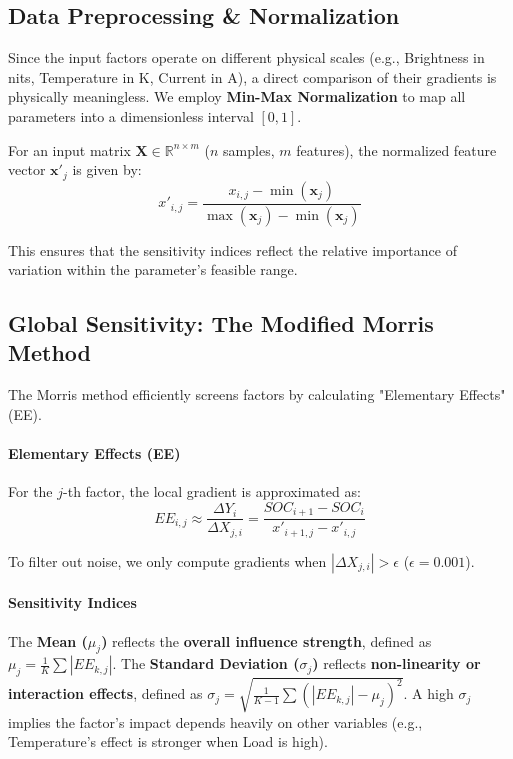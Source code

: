 \documentclass{mcmthesis}
\begin{document}
\subsection{Data Preprocessing \& Normalization}
Since the input factors operate on different physical scales (e.g., Brightness in nits, Temperature in K, Current in A), a direct comparison of their gradients is physically meaningless. We employ \textbf{Min-Max Normalization} to map all parameters into a dimensionless interval $[0, 1]$.

For an input matrix $\mathbf{X} \in \mathbb{R}^{n \times m}$ ($n$ samples, $m$ features), the normalized feature vector $\mathbf{x}'_j$ is given by:
\begin{equation}
x'_{i,j} = \frac{x_{i,j} - \min(\mathbf{x}_j)}{\max(\mathbf{x}_j) - \min(\mathbf{x}_j)}
\end{equation}

This ensures that the sensitivity indices reflect the relative importance of variation within the parameter's feasible range.

\subsection{Global Sensitivity: The Modified Morris Method}
The Morris method efficiently screens factors by calculating "Elementary Effects" (EE).

\paragraph{Elementary Effects (EE)}
For the $j$-th factor, the local gradient is approximated as:
\begin{equation}
EE_{i,j} \approx \frac{\Delta Y_i}{\Delta X_{j,i}} = \frac{SOC_{i+1} - SOC_i}{x'_{i+1,j} - x'_{i,j}}
\end{equation}

To filter out noise, we only compute gradients when $|\Delta X_{j,i}| > \epsilon$ ($\epsilon=0.001$).

\paragraph{Sensitivity Indices}
The \textbf{Mean ($\mu_j$)} reflects the \textbf{overall influence strength}, defined as $\mu_j = \frac{1}{K} \sum |EE_{k,j}|$. The \textbf{Standard Deviation ($\sigma_j$)} reflects \textbf{non-linearity or interaction effects}, defined as $\sigma_j = \sqrt{\frac{1}{K-1} \sum (|EE_{k,j}| - \mu_j)^2}$. A high $\sigma_j$ implies the factor's impact depends heavily on other variables (e.g., Temperature's effect is stronger when Load is high).
\end{document}
